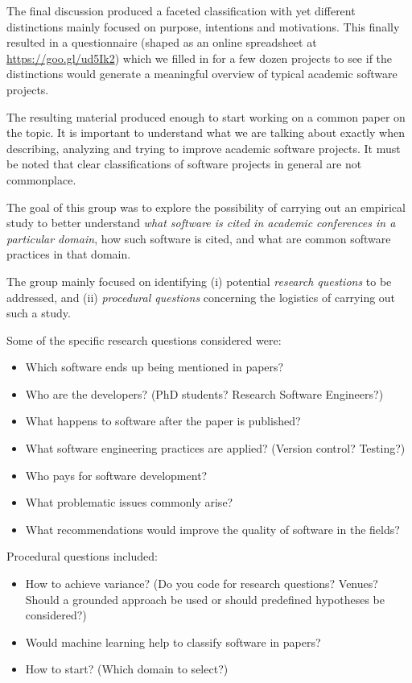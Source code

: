 \documentclass[a4paper,UKenglish]{dagrep}
\begin{document}
The final discussion produced a faceted classification with yet different distinctions mainly focused on purpose, intentions and motivations. This finally resulted in a questionnaire (shaped as an online spreadsheet at \url{https://goo.gl/ud5Ik2}) which we filled in for a few dozen projects to see if the distinctions would generate a meaningful overview of typical academic software projects.

The resulting material produced enough to start working on a common paper on the topic. It is important to understand what we are talking about exactly when describing, analyzing and trying to improve academic software projects. It must be noted that clear classifications of software projects in general are not commonplace. 



The goal of this group was to explore the possibility of carrying out an empirical study to better understand \emph{what software is cited in academic conferences in a particular domain}, how such software is cited, and what are common software practices in that domain.

The group mainly focused on identifying (i) potential \emph{research questions} to be addressed, and (ii) \emph{procedural questions} concerning the logistics of carrying out such a study.

Some of the specific research questions considered were:
\begin{itemize}
\item Which software ends up being mentioned in papers?
\item Who are the developers? (PhD students? Research Software Engineers?)
\item What happens to software after the paper is published?
\item What software engineering practices are applied? (Version control? Testing?)
\item Who pays for software development?
\item What problematic issues commonly arise? 
\item What recommendations would improve the quality of software in the fields?
\end{itemize}

Procedural questions included:
\begin{itemize}
\item How to achieve variance? (Do you code for research questions? Venues? Should a grounded approach be used or should predefined hypotheses be considered?)
\item Would machine learning help to classify software in papers?
\item How to start? (Which domain to select?)
\end{itemize}
\end{document}
